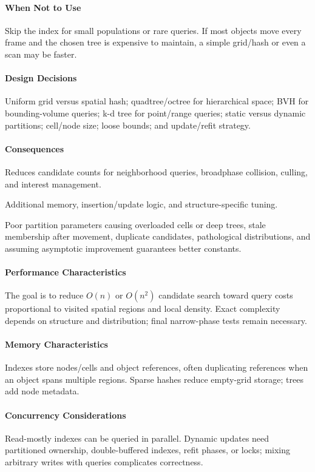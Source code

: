\documentclass[11pt]{article}
\begin{document}
\paragraph{When Not to Use} Skip the index for small populations or rare queries. If most objects move every frame and the chosen tree is expensive to maintain, a simple grid/hash or even a scan may be faster.
\paragraph{Design Decisions} Uniform grid versus spatial hash; quadtree/octree for hierarchical space; BVH for bounding-volume queries; k-d tree for point/range queries; static versus dynamic partitions; cell/node size; loose bounds; and update/refit strategy.
\paragraph{Consequences}
\begin{description}[leftmargin=2.7cm,style=nextline]
\item[Benefits] Reduces candidate counts for neighborhood queries, broadphase collision, culling, and interest management.
\item[Costs] Additional memory, insertion/update logic, and structure-specific tuning.
\item[Risks] Poor partition parameters causing overloaded cells or deep trees, stale membership after movement, duplicate candidates, pathological distributions, and assuming asymptotic improvement guarantees better constants.
\end{description}
\paragraph{Performance Characteristics} The goal is to reduce $O(n)$ or $O(n^2)$ candidate search toward query costs proportional to visited spatial regions and local density. Exact complexity depends on structure and distribution; final narrow-phase tests remain necessary.
\paragraph{Memory Characteristics} Indexes store nodes/cells and object references, often duplicating references when an object spans multiple regions. Sparse hashes reduce empty-grid storage; trees add node metadata.
\paragraph{Concurrency Considerations} Read-mostly indexes can be queried in parallel. Dynamic updates need partitioned ownership, double-buffered indexes, refit phases, or locks; mixing arbitrary writes with queries complicates correctness.
\end{document}
